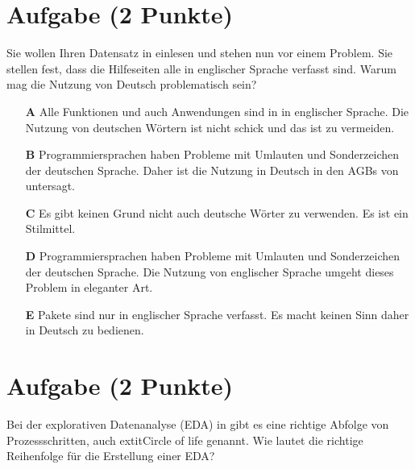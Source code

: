 \documentclass[a4paper, 9pt]{scrartcl}\usepackage[]{graphicx}\usepackage[]{xcolor}
\begin{document}
\section{Aufgabe \hfill (2 Punkte)}



Sie wollen Ihren Datensatz in \Rlogo einlesen und stehen nun vor einem Problem. Sie stellen fest, dass die Hilfeseiten alle in englischer Sprache verfasst sind. Warum mag die Nutzung von Deutsch problematisch sein?



\begin{enumerate}
\item [\textbf{A} \msquare] Alle Funktionen und auch Anwendungen sind in \Rlogo in englischer Sprache. Die Nutzung von deutschen Wörtern ist nicht schick und das ist zu vermeiden.
\item [\textbf{B} \msquare] Programmiersprachen haben Probleme mit Umlauten und Sonderzeichen der deutschen Sprache. Daher ist die Nutzung in Deutsch in den AGBs von \Rlogo untersagt.
\item [\textbf{C} \msquare] Es gibt keinen Grund nicht auch deutsche Wörter zu verwenden. Es ist ein Stilmittel.
\item [\textbf{D} \msquare] Programmiersprachen haben Probleme mit Umlauten und Sonderzeichen der deutschen Sprache. Die Nutzung von englischer Sprache umgeht dieses Problem in eleganter Art.
\item [\textbf{E} \msquare] \Rlogo Pakete sind nur in englischer Sprache verfasst. Es macht keinen Sinn \Rlogo daher in Deutsch zu bedienen.
\end{enumerate}

\section{Aufgabe \hfill (2 Punkte)}



Bei der explorativen Datenanalyse (EDA) in \Rlogo gibt es eine richtige Abfolge von Prozessschritten, auch 	extit{Circle of life} genannt. Wie lautet die richtige Reihenfolge für die Erstellung einer EDA?
\end{document}
